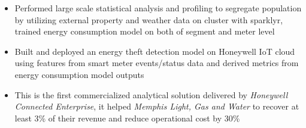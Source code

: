 \documentclass[11pt,a4paper,sans]{moderncv}        %
\begin{document}
\begin{itemize}
{{\begin{itemize}
				\item Performed large scale statistical analysis and profiling to segregate population by utilizing external property and weather data on cluster with sparklyr, trained energy consumption model on both of segment and meter level
				\item Built and deployed an energy theft detection model on Honeywell IoT cloud using features from smart meter events/status data and derived metrics from energy consumption model outputs
				\item This is the first commercialized analytical solution delivered by \emph{Honeywell Connected Enterprise}, it helped \emph{Memphis Light, Gas and Water} to recover at least 3\% of their revenue and reduce operational cost by 30\%
			\end{itemize}}}

	\vspace{4pt}


\end{itemize}
\end{document}
